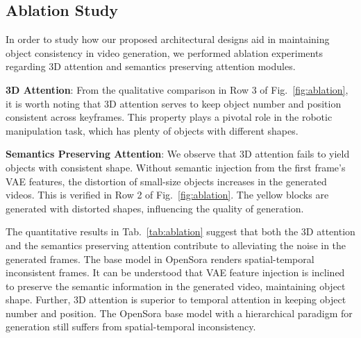 \documentclass[letterpaper, 10 pt, conference]{ieeeconf}  %
\begin{document}
\subsection{Ablation Study}


In order to study how our proposed architectural designs aid in maintaining object consistency in video generation, we performed ablation experiments regarding 3D attention and semantics preserving attention modules.

\noindent\textbf{3D Attention}: From the qualitative comparison in Row 3 of Fig.~\ref{fig:ablation}, it is worth noting that 3D attention serves to keep object number and position consistent across keyframes. This property plays a pivotal role in the robotic manipulation task, which has plenty of objects with different shapes.

\noindent\textbf{Semantics Preserving Attention}: We observe that 3D attention fails to yield objects with consistent shape. Without semantic injection from the first frame's VAE features, the distortion of small-size objects increases in the generated videos. This is verified in Row 2 of Fig.~\ref{fig:ablation}. The yellow blocks are generated with distorted shapes, influencing the quality of generation. 

The quantitative results in Tab.~\ref{tab:ablation} suggest that both the 3D attention and the semantics preserving attention contribute to alleviating the noise in the generated frames. 
The base model in OpenSora renders spatial-temporal inconsistent frames. It can be understood that VAE feature injection is inclined to preserve the semantic information in the generated video, maintaining object shape. Further, 3D attention is superior to temporal attention in keeping object number and position. The OpenSora base model with a hierarchical paradigm for generation still suffers from spatial-temporal inconsistency.








\end{document}
